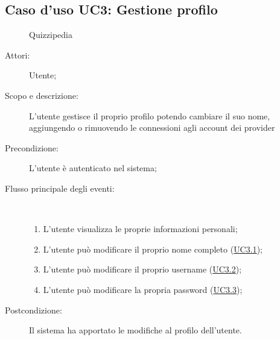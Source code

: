 \subsection{Caso d'uso UC3: Gestione profilo}
	\begin{figure}[H]
		\centering
		\begin{resizedtikzpicture}{\textwidth}
		\begin{umlsystem}[x=0, fill=lightgray!20]{Quizzipedia}
		\end{umlsystem}
		\end{resizedtikzpicture}
		\caption{}
	\end{figure}
\begin{description}
\item[Attori:] Utente;
\item[Scopo e descrizione:] L'utente gestisce il proprio profilo potendo cambiare il suo nome, aggiungendo o rimuovendo le connessioni agli account dei provider 
      \item[Precondizione:] L'utente è autenticato nel sistema;

        \item[Flusso principale degli eventi:] \ 
 \begin{enumerate}
          \item L’utente visualizza le proprie informazioni personali;
          \item L'utente può modificare il proprio nome completo (\hyperlink{UC3.1}{UC3.1});
          \item L'utente può modificare il proprio username	 (\hyperlink{UC3.2}{UC3.2});
          \item L'utente può modificare la propria password (\hyperlink{UC3.3}{UC3.3});

      \end{enumerate}
    \item[Postcondizione:] Il sistema ha apportato le modifiche al profilo dell'utente.
  \end{description}
\hypertarget{UC3.1}{}
